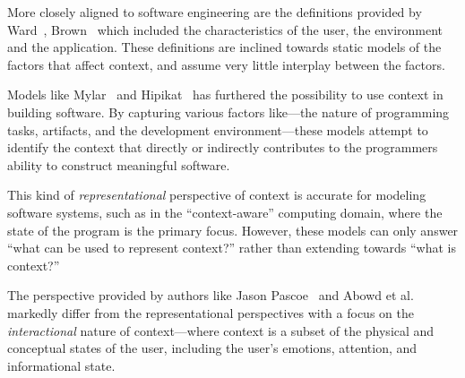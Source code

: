 More closely aligned to software engineering are the definitions provided by Ward~\cite{Ward:1997}, Brown~\cite{Brown:1995} which included the characteristics of the user, the environment and the application. These definitions are inclined towards static models of the factors that affect context, and assume very little interplay between the factors.


Models like Mylar~\cite{Kersten:2006} and Hipikat~\cite{Vcubranic:2003} has furthered the possibility to use context in building software. By capturing various factors like---the nature of programming tasks, artifacts, and the development environment---these models attempt to identify the context that directly or indirectly contributes to the programmers ability to construct meaningful software. 


This kind of \textit{representational} perspective of context is accurate for modeling software systems, such as in the ``context-aware'' computing domain, where the state of the program is the primary focus. However, these models can only answer ``what can be used to represent context?'' rather than extending towards ``what is context?''


The perspective provided by authors like Jason Pascoe~\citep{Pascoe:1998} and Abowd et al.~\cite{Abowd:1999} markedly differ from the representational perspectives with a focus on the \textit{interactional} nature of context---where context is a subset of the physical and conceptual states of the user, including the user's emotions, attention, and informational state.

